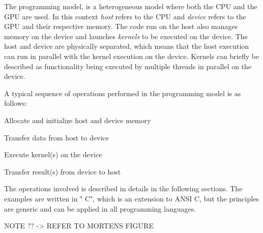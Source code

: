 The \cuda{} programming model, is a heterogeneous model where both the CPU and the GPU are used.
In this context \textit{host} refers to the CPU and \textit{device} refers to the GPU and their respective memory.
The code run on the host also manages memory on the device and launches \textit{kernels} to be executed on the device.
The host and device are physically separated, which means that the host execution can run in parallel with the kernel execution on the device.
Kernels can briefly be described as functionality being executed by multiple threads in parallel on the device.

\noindent A typical sequence of operations performed in the \cuda{} programming model is as follows:
\begin{enumerateSmall}
	\item Allocate and initialize host and device memory
	\item Transfer data from host to device
	\item Execute kernel(s) on the device
	\item Transfer result(s) from device to host
\end{enumerateSmall}
The operations involved is described in details in the following sections.
The \cuda{} examples are written in "\cuda{} C", which is an extension to ANSI C, but the principles are generic and can be applied in all \cuda{} programming languages.


NOTE ?? -> REFER TO MORTENS FIGURE